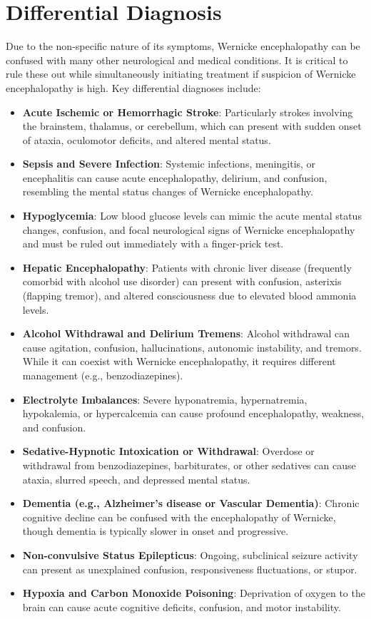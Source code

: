 \section*{Differential Diagnosis}
Due to the non-specific nature of its symptoms, Wernicke encephalopathy can be confused with many other neurological and medical conditions. It is critical to rule these out while simultaneously initiating treatment if suspicion of Wernicke encephalopathy is high. Key differential diagnoses include:

\begin{itemize}
    \item \textbf{Acute Ischemic or Hemorrhagic Stroke}: Particularly strokes involving the brainstem, thalamus, or cerebellum, which can present with sudden onset of ataxia, oculomotor deficits, and altered mental status.
    \item \textbf{Sepsis and Severe Infection}: Systemic infections, meningitis, or encephalitis can cause acute encephalopathy, delirium, and confusion, resembling the mental status changes of Wernicke encephalopathy.
    \item \textbf{Hypoglycemia}: Low blood glucose levels can mimic the acute mental status changes, confusion, and focal neurological signs of Wernicke encephalopathy and must be ruled out immediately with a finger-prick test.
    \item \textbf{Hepatic Encephalopathy}: Patients with chronic liver disease (frequently comorbid with alcohol use disorder) can present with confusion, asterixis (flapping tremor), and altered consciousness due to elevated blood ammonia levels.
    \item \textbf{Alcohol Withdrawal and Delirium Tremens}: Alcohol withdrawal can cause agitation, confusion, hallucinations, autonomic instability, and tremors. While it can coexist with Wernicke encephalopathy, it requires different management (e.g., benzodiazepines).
    \item \textbf{Electrolyte Imbalances}: Severe hyponatremia, hypernatremia, hypokalemia, or hypercalcemia can cause profound encephalopathy, weakness, and confusion.
    \item \textbf{Sedative-Hypnotic Intoxication or Withdrawal}: Overdose or withdrawal from benzodiazepines, barbiturates, or other sedatives can cause ataxia, slurred speech, and depressed mental status.
    \item \textbf{Dementia (e.g., Alzheimer's disease or Vascular Dementia)}: Chronic cognitive decline can be confused with the encephalopathy of Wernicke, though dementia is typically slower in onset and progressive.
    \item \textbf{Non-convulsive Status Epilepticus}: Ongoing, subclinical seizure activity can present as unexplained confusion, responsiveness fluctuations, or stupor.
    \item \textbf{Hypoxia and Carbon Monoxide Poisoning}: Deprivation of oxygen to the brain can cause acute cognitive deficits, confusion, and motor instability.
\end{itemize}

